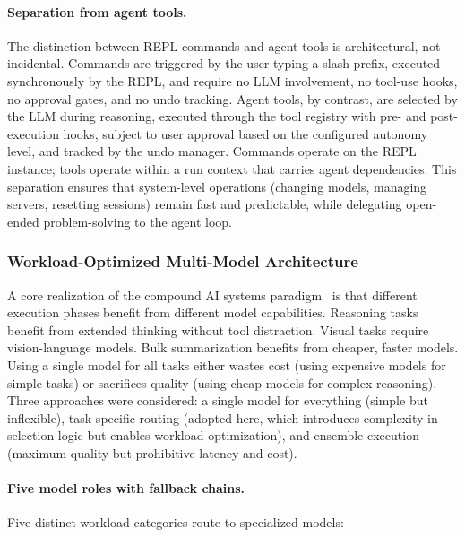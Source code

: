 \paragraph{Separation from agent tools.} The distinction between REPL commands and agent tools is architectural, not incidental. Commands are triggered by the user typing a slash prefix, executed synchronously by the REPL, and require no LLM involvement, no tool-use hooks, no approval gates, and no undo tracking. Agent tools, by contrast, are selected by the LLM during reasoning, executed through the tool registry with pre- and post-execution hooks, subject to user approval based on the configured autonomy level, and tracked by the undo manager. Commands operate on the REPL instance; tools operate within a run context that carries agent dependencies. This separation ensures that system-level operations (changing models, managing servers, resetting sessions) remain fast and predictable, while delegating open-ended problem-solving to the agent loop.


\subsubsection{Workload-Optimized Multi-Model Architecture}
\label{sec:multi_model}

A core realization of the compound AI systems paradigm~\cite{zaharia2024compound} is that different execution phases benefit from different model capabilities. Reasoning tasks benefit from extended thinking without tool distraction. Visual tasks require vision-language models. Bulk summarization benefits from cheaper, faster models. Using a single model for all tasks either wastes cost (using expensive models for simple tasks) or sacrifices quality (using cheap models for complex reasoning). Three approaches were considered: a single model for everything (simple but inflexible), task-specific routing (adopted here, which introduces complexity in selection logic but enables workload optimization), and ensemble execution (maximum quality but prohibitive latency and cost).

\paragraph{Five model roles with fallback chains.} Five distinct workload categories route to specialized models:

